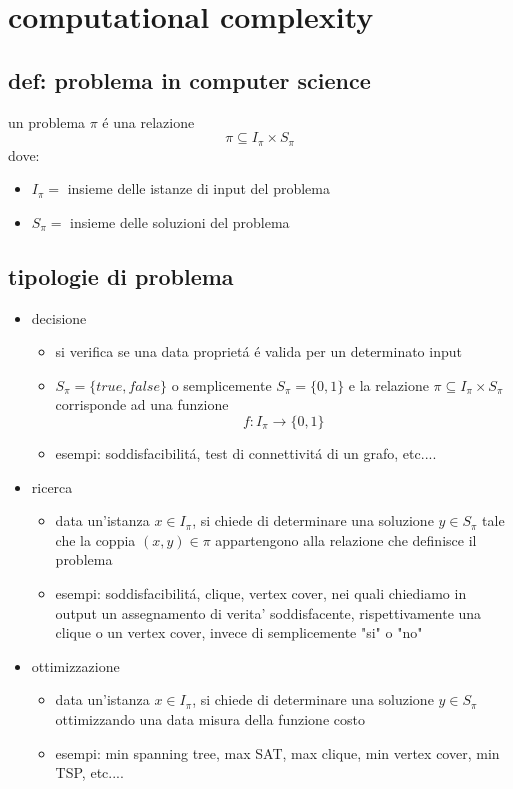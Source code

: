 \section{computational complexity}

\subsection{def: problema in computer science}
un problema $\pi$ \'e una relazione
$$\pi\subseteq I_{\pi}\times S_{\pi}$$
dove:
\begin{itemize}
	\item $I_{\pi}=$ insieme delle istanze di input del problema
	\item $S_{\pi}=$ insieme delle soluzioni del problema
\end{itemize}

\subsection{tipologie di problema}
\begin{itemize}
	\item decisione
		\begin{itemize}
			\item si verifica se una data propriet\'a \'e valida per un determinato input
			\item $S_{\pi}=\{true,false\}$ o semplicemente $S_{\pi}=\{0,1\}$ e la relazione $\pi\subseteq I_{\pi}\times S_{\pi}$ corrisponde ad una funzione $$f:I_{\pi}\rightarrow\{0,1\}$$ 
			\item esempi: soddisfacibilit\'a, test di connettivit\'a di un grafo, etc....
		\end{itemize}
	\item ricerca
	\begin{itemize}
		\item data un'istanza $x\in I_{\pi}$, si chiede di determinare una soluzione $y\in S_{\pi}$ tale che la coppia $(x,y)\in\pi$ appartengono alla relazione che definisce il problema
		\item esempi: soddisfacibilit\'a, clique, vertex cover, nei quali chiediamo in output un assegnamento di verita' soddisfacente, rispettivamente una clique o un vertex cover, invece di semplicemente "si" o "no"
	\end{itemize}
	\item ottimizzazione
	\begin{itemize}
		\item data un'istanza $x\in I_{\pi}$, si chiede di determinare una soluzione $y\in S_{\pi}$ ottimizzando una data misura della funzione costo
		\item esempi: min spanning tree, max SAT, max clique, min vertex cover, min TSP, etc....
	\end{itemize}
\end{itemize}

